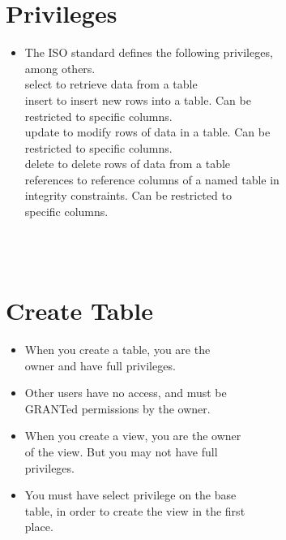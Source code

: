 \documentclass[12pt]{article}
\begin{document}
\begin{itemize}
\begin{itemize}
\begin{itemize}
\begin{itemize}
\begin{itemize}
\section{Privileges}
\begin{itemize}
  \item The ISO standard defines the following privileges, \\ 
among others.\\ 
select to retrieve data from a table\\ 
insert to insert new rows into a table. Can be \\ 
restricted to specific columns.\\ 
update to modify rows of data in a table. Can be \\ 
restricted to specific columns.\\ 
delete to delete rows of data from a table\\ 
references to reference columns of a named table in \\ 
integrity constraints. Can be restricted to \\ 
specific columns.\\ 
\end{itemize}
\\ 
 \\ 
\section{Create Table}
\begin{itemize}
  \item When you create a table, you are the \\ 
owner and have full privileges.\\ 
  \item Other users have no access, and must be \\ 
GRANTed permissions by the owner.\\ 
  \item When you create a view, you are the owner\\ 
of the view. But you may not have full \\ 
privileges.\\ 
  \item You must have select privilege on the base \\ 
table, in order to create the view in the first \\ 
place.\\ 
\end{itemize}
\\ 
 \\ 

\end{itemize}
\end{itemize}
\end{itemize}
\end{itemize}
\end{itemize}
\end{document}

